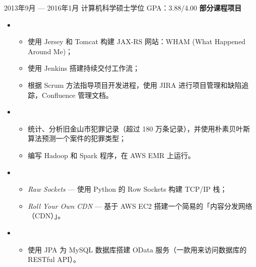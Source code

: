 \documentclass{newresume}
\begin{document}
\smallskip


\begin{body}
	{2013年9月 --- 2016年1月}
	{计算机科学硕士学位}
	{GPA：3.88/4.00}
	\textbf{部分课程项目}
	\begin{itemize}
	\item {}
	\begin{itemize}
		\item 使用 Jersey 和 Tomcat 构建 JAX-RS 网站：WHAM (What Happened Around Me)；
		\item 使用 Jenkins 搭建持续交付工作流；
		\item 根据 Scrum 方法指导项目开发进程，使用 JIRA 进行项目管理和缺陷追踪，Confluence 管理文档。
	\end{itemize}

	\item {}
	\begin{itemize}
		\item 统计、分析旧金山市犯罪记录（超过 180 万条记录），并使用朴素贝叶斯算法预测一个案件的犯罪类型；
		\item 编写 Hadoop 和 Spark 程序，在 AWS EMR 上运行。
	\end{itemize}

	\item {}
	\begin{itemize}
		\item \textit{Raw Sockets} --- 使用 Python 的 Row Sockets 构建 TCP/IP 栈；
		\item \textit{Roll Your Own CDN} --- 基于 AWS EC2 搭建一个简易的「内容分发网络（CDN）」。
	\end{itemize}

	\item {}
	\begin{itemize}
		\item 使用 JPA 为 MySQL 数据库搭建 OData 服务（一款用来访问数据库的 RESTful API）。
	\end{itemize}


\end{itemize}
\end{body}
\end{document}
